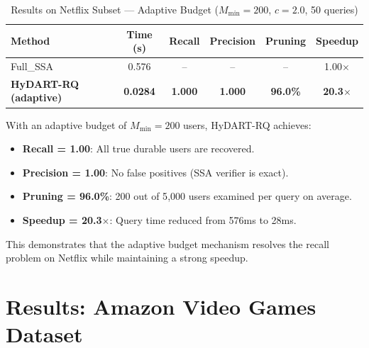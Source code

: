 \begin{table}[htbp]
\centering
\caption{Results on Netflix Subset --- Adaptive Budget ($M_{\min}=200$, $c=2.0$, 50 queries)}
\label{tab:netflix_adaptive}
\begin{tabular}{lccccc}
\toprule
\textbf{Method} & \textbf{Time (s)} & \textbf{Recall} & \textbf{Precision} & \textbf{Pruning} & \textbf{Speedup} \\
\midrule
Full\_SSA                     & 0.576  & --    & --    & --    & 1.00$\times$ \\
\textbf{HyDART-RQ (adaptive)} & \textbf{0.0284} & \textbf{1.000} & \textbf{1.000} & \textbf{96.0\%} & \textbf{20.3$\times$} \\
\bottomrule
\end{tabular}
\end{table}

With an adaptive budget of $M_{\min} = 200$ users, HyDART-RQ achieves:
\begin{itemize}
  \item \textbf{Recall = 1.00}: All true durable users are recovered.
  \item \textbf{Precision = 1.00}: No false positives (SSA verifier is exact).
  \item \textbf{Pruning = 96.0\%}: 200 out of 5{,}000 users examined per query on average.
  \item \textbf{Speedup = 20.3$\times$}: Query time reduced from 576ms to 28ms.
\end{itemize}

This demonstrates that the adaptive budget mechanism resolves the recall problem on Netflix while maintaining a strong speedup.

\section{Results: Amazon Video Games Dataset}

